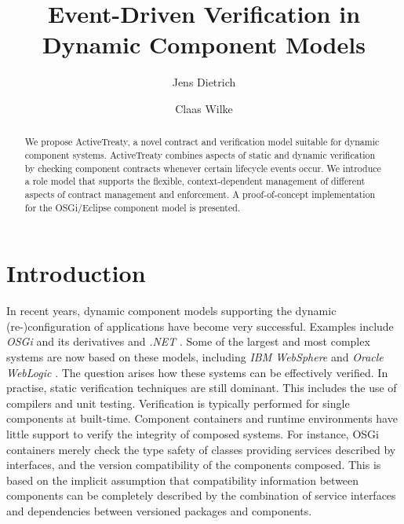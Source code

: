 \documentclass{llncs}
\begin{document}
\title{Event-Driven Verification in Dynamic Component Models}

\author{Jens Dietrich \and Claas Wilke}


\maketitle



\begin{abstract}

We propose ActiveTreaty, a novel contract and verification model suitable for dynamic component systems. ActiveTreaty combines aspects of static and dynamic verification by checking component contracts whenever certain lifecycle events occur. We introduce a role model that supports the flexible, context-dependent management of different aspects of contract management and enforcement. 
A proof-of-concept implementation for the OSGi/Eclipse component model is presented. 

\end{abstract}



\section{Introduction}

In recent years, dynamic component models supporting the dynamic (re-)\-con\-fi\-gu\-ra\-tion of applications have become very successful. Examples include \textit{OSGi} \cite{OSGI} and its derivatives and \textit{.NET} \cite{MSdotNet}. Some of the largest and most complex systems are now based on these models, including \textit{IBM WebSphere} \cite{IBMWebsphere} and \textit{Oracle WebLogic} \cite{OracleWebLogic}. The question arises how these systems can be effectively verified. In practise, static verification techniques are still dominant. This includes the use of compilers and unit testing. Verification is typically performed for single components at built-time. Component containers and runtime environments have little support to verify the integrity of composed systems. For instance, OSGi containers merely check the type safety of classes providing services described by interfaces, and the version compatibility of the components composed. This is based on the implicit assumption that compatibility information between components can be completely described by the combination of service interfaces and dependencies between versioned packages and components. 
\end{document}
